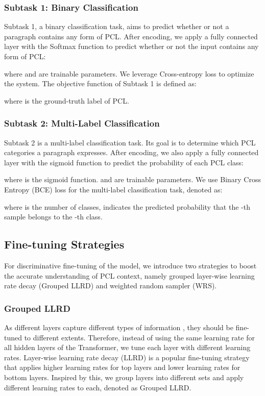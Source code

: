 \documentclass[11pt]{article}
\begin{document}
\subsubsection{Subtask 1: Binary Classification}
Subtask 1, a binary classification task, aims to predict whether or not a paragraph contains any form of PCL.
After encoding, we apply a fully connected layer with the Softmax function to predict whether or not the input contains any form of PCL:

where  and  are trainable parameters.
We leverage Cross-entropy loss to optimize the system. The objective function of Subtask 1 is defined as:

where  is the ground-truth label of PCL.

\subsubsection{Subtask 2: Multi-Label Classification}
Subtask 2 is a multi-label classification task. Its goal is to determine  which PCL categories a paragraph expresses. 
After encoding, we also apply a fully connected layer with the sigmoid function to predict the probability of each PCL class:

where  is the sigmoid function.
 and  are trainable parameters.
We use Binary Cross Entropy (BCE) loss \citep{DBLP:journals/pami/BengioCV13} for the multi-label classification task, denoted as: 

where  is the number of classes,  indicates the predicted probability that the -th sample belongs to the -th class.



\subsection{Fine-tuning Strategies}
For discriminative fine-tuning of the model, we introduce two strategies to boost the accurate understanding of PCL context, namely grouped layer-wise learning rate decay (Grouped LLRD) and weighted random sampler (WRS). 


\subsubsection{Grouped LLRD}
As different layers capture different types of information \citep{yosinski2014transferable},  they should be fine-tuned to different extents. Therefore, instead of using the same learning rate for all hidden layers of the Transformer, we tune each layer with different learning rates. 
Layer-wise learning rate decay (LLRD) \citep{DBLP:conf/acl/RuderH18,DBLP:conf/iclr/0007WKWA21} 
is a popular fine-tuning strategy that applies higher learning rates for top layers and lower learning rates for bottom layers. 
Inspired by this, we group layers into different sets and apply different learning rates to each, denoted as Grouped LLRD. 
\end{document}
